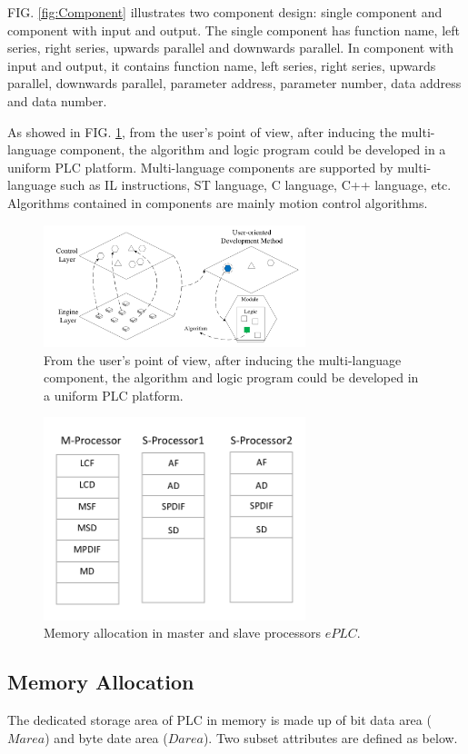 \documentclass[journal,UTF8]{IEEEtran}
\begin{document}
FIG. \ref{fig:Component} illustrates two component design: single component and component with input and output. The single component has function name, left series, right series, upwards parallel and downwards parallel. In component with input and output, it contains function name, left series, right series, upwards parallel, downwards parallel, parameter address, parameter number, data address and data number.

As showed in FIG. \ref{fig:SoftwareStructure}, from the user's point of view, after inducing the multi-language component, the algorithm and logic program could be developed in a uniform PLC platform. Multi-language components are supported by multi-language such as IL instructions, ST language, C language, C++ language, etc. Algorithms contained in components are mainly motion control algorithms.
\begin{figure}
	\centering
	\includegraphics[width=3in]{fig/FIG3.pdf}
	\caption{ From the user's point of view, after inducing the multi-language component, the algorithm and logic program could be developed in a uniform PLC platform.}
	\label{fig:SoftwareStructure}
\end{figure}


\begin{figure}
	\centering
	\includegraphics[width=3in]{fig/FIG4.pdf}
	\caption{ Memory allocation in master and slave processors $ePLC$.}
	\label{fig:Memory}
\end{figure}

\subsection{Memory Allocation}  
The dedicated storage area of PLC in memory is made up of bit data area ($M area$) and byte date area ($D area$). Two subset attributes are defined as below.
\end{document}
